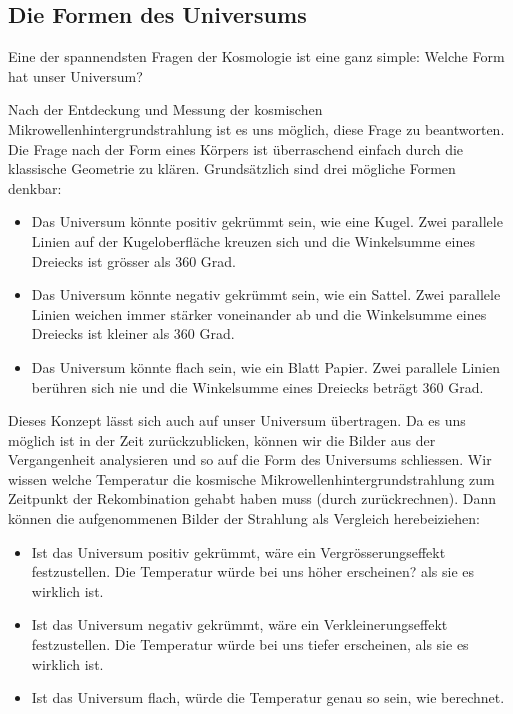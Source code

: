 \subsection{Die Formen des Universums}
Eine der spannendsten Fragen der Kosmologie ist eine ganz simple: Welche Form 
hat unser Universum?

Nach der Entdeckung und Messung der kosmischen Mikrowellenhintergrundstrahlung 
ist es uns möglich, diese Frage zu beantworten.
Die Frage nach der Form eines Körpers ist überraschend einfach durch die 
klassische Geometrie zu klären.
Grundsätzlich sind drei mögliche Formen denkbar:
\begin{itemize}
	\item Das Universum könnte positiv gekrümmt sein, wie eine Kugel.
	Zwei parallele Linien auf der Kugeloberfläche kreuzen sich und die 
	Winkelsumme eines Dreiecks ist grösser als 360 Grad.
	\item Das Universum könnte negativ gekrümmt sein, wie ein Sattel.
	Zwei parallele Linien weichen immer stärker voneinander ab und die 
	Winkelsumme eines Dreiecks ist kleiner als 360 Grad.
	\item Das Universum könnte flach sein, wie ein Blatt Papier.
	Zwei parallele Linien berühren sich nie und die Winkelsumme eines Dreiecks 
	beträgt 360 Grad.
\end{itemize}
Dieses Konzept lässt sich auch auf unser Universum übertragen.
Da es uns möglich ist in der Zeit zurückzublicken, können wir die Bilder aus 
der Vergangenheit analysieren und so auf die Form des Universums schliessen.
Wir wissen welche Temperatur die kosmische Mikrowellenhintergrundstrahlung zum 
Zeitpunkt der Rekombination gehabt haben muss (durch zurückrechnen).
Dann können die aufgenommenen Bilder der Strahlung als Vergleich herebeiziehen:
\begin{itemize}
	\item Ist das Universum positiv gekrümmt, wäre ein Vergrösserungseffekt 
	festzustellen.
	Die Temperatur würde bei uns höher erscheinen? als sie es wirklich ist.
	\item Ist das Universum negativ gekrümmt, wäre ein Verkleinerungseffekt 
	festzustellen.
	Die Temperatur würde bei uns tiefer erscheinen, als sie es wirklich ist.
	\item Ist das Universum flach, würde die Temperatur genau so sein, wie 
	berechnet.
\end{itemize} 